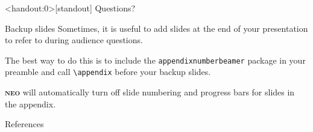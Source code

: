 \documentclass[10pt]{beamer}
\newcommand{\themename}{\textbf{\textsc{neo}}\xspace}
\begin{document}
\begin{frame}<handout:0>[standout]
  Questions?
\end{frame}

\appendix

\begin{frame}[fragile]{Backup slides}
  Sometimes, it is useful to add slides at the end of your presentation to
  refer to during audience questions.

  The best way to do this is to include the \verb|appendixnumberbeamer|
  package in your preamble and call \verb|\appendix| before your backup slides.

  \themename will automatically turn off slide numbering and progress bars for
  slides in the appendix.
\end{frame}

\begin{frame}[allowframebreaks]{References}

  
  

\end{frame}
\end{document}
